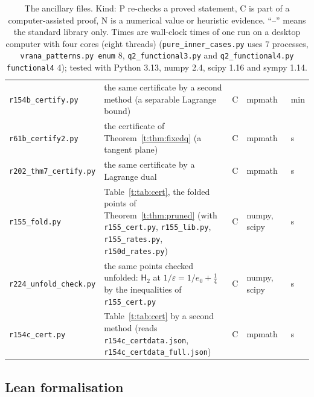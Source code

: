 \documentclass[11pt]{article}
\theoremstyle{definition}
\theoremstyle{remark}
\newcommand{\Hyp}{\mathsf{H}}
\begin{document}
\begin{table}[!htbp]
\begin{tabular}{@{}>{\raggedright}p{}>{\raggedright}p{}c>{\raggedright}p{}>{\raggedright\arraybackslash}p{}@{}}
\texttt{r154b\_certify.py} & the same certificate by a second method (a separable Lagrange bound) & C & mpmath & 3~min\\
\texttt{r61b\_certify2.py} & the certificate of Theorem~\ref{t:thm:fixedq} (a tangent plane) & C & mpmath & 1~s\\
\texttt{r202\_thm7\_certify.py} & the same certificate by a Lagrange dual & C & mpmath & 1~s\\
\texttt{r155\_fold.py} & Table~\ref{t:tab:cert}, the folded points of Theorem~\ref{t:thm:pruned} (with \texttt{r155\_cert.py}, \texttt{r155\_lib.py}, \texttt{r155\_rates.py}, \texttt{r150d\_rates.py}) & C & numpy, scipy & 49~s\\
\texttt{r224\_unfold\_check.py} & the same points checked unfolded: $\Hyp_2$ at $1/\varepsilon=1/e_0+\frac14$ by the inequalities of \texttt{r155\_cert.py} & C & numpy, scipy & 2~s\\
\texttt{r154c\_cert.py} & Table~\ref{t:tab:cert} by a second method (reads \texttt{r154c\_certdata.json}, \texttt{r154c\_certdata\_full.json}) & C & mpmath & 2~s
\end{tabular}
\caption{The ancillary files. Kind: P re-checks a proved statement, C is part of a computer-assisted proof, N is a numerical value or heuristic evidence. ``--'' means the standard library only. Times are wall-clock times of one run on a desktop computer with four cores (eight threads) (\texttt{pure\_inner\_cases.py} uses $7$ processes, \texttt{vrana\_patterns.py enum} $8$, \texttt{q2\_functional3.py} and \texttt{q2\_functional4.py functional4} $4$); tested with Python 3.13, numpy 2.4, scipy 1.16 and sympy 1.14.}
\label{tab:anc}
\end{table}

\subsection{Lean formalisation}\label{m:sec:lean}
\end{document}

